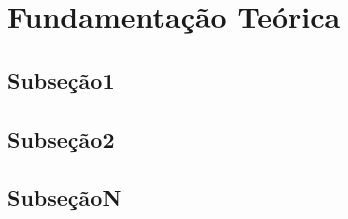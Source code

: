 \section{Fundamentação Teórica}

\subsection{Subseção1}

\subsection{Subseção2}

\subsection{SubseçãoN}
   